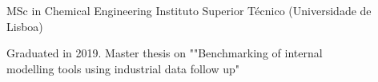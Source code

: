 

\begin{cventries}

  \cventry
    {MSc in Chemical Engineering} %
    {Instituto Superior Técnico (Universidade de Lisboa)} %
    {} %
    {} %
    {
      \begin{cvitems} %
        \item {Graduated in 2019. Master thesis on ""Benchmarking of internal\\ modelling tools using industrial data follow up"}
      \end{cvitems}
    }

\end{cventries}